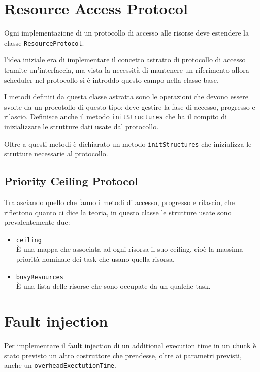 \section{Resource Access Protocol}
\label{sec:resaccprot}
Ogni implementazione di un protocollo di accesso alle risorse deve estendere la classe \texttt{ResourceProtocol}.

l'idea iniziale era di implementare il concetto astratto di protocollo di accesso tramite un'interfaccia, ma vista la necessità di mantenere un riferimento allora scheduler nel protocollo si è introddo questo campo nella classe base.

\myskip

I metodi definiti da questa classe astratta sono le operazioni che devono essere svolte da un procotollo di questo tipo: deve gestire la fase di accesso, progresso e rilascio. Definisce anche il metodo \texttt{initStructures} che ha il compito di inizializzare le strutture dati usate dal protocollo.

Oltre a questi metodi è dichiarato un metodo \texttt{initStructures} che inizializza le strutture necessarie al protocollo.

\subsection{Priority Ceiling Protocol}
Tralasciando quello che fanno i metodi di accesso, progresso e rilascio, che riflettono quanto ci dice la teoria, in questo classe le strutture usate sono prevalentemente due:
\begin{itemize}
    \item \texttt{ceiling} \\
        È una mappa che associata ad ogni risorsa il suo ceiling, cioè la massima priorità nominale dei task che usano quella risorsa.
    \item \texttt{busyResources}\\
        È una lista delle risorse che sono occupate da un qualche task.
\end{itemize}

\section{Fault injection}
Per implementare il fault injection di un additional execution time in un \texttt{chunk} è stato previsto un altro costruttore che prendesse, oltre ai parametri previsti, anche un \texttt{overheadExectutionTime}.


